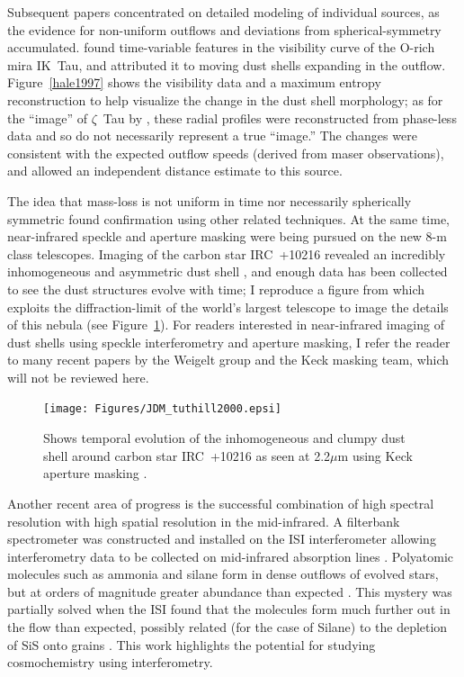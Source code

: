 \documentclass[12pt]{iopart}
\begin{document}
Subsequent papers concentrated on detailed modeling of individual
sources, as the evidence for non-uniform outflows \citep{monnier1997}
and deviations from spherical-symmetry \citep{lopez1997} accumulated.
\citet{hale1997} found time-variable features in the visibility curve
of the O-rich mira IK~Tau, and attributed it to moving dust shells
expanding in the outflow.  Figure~\ref{hale1997} shows the visibility
data and a maximum entropy reconstruction to help visualize the change
in the dust shell morphology; as for the ``image'' of $\zeta$~Tau by
\citet{quirrenbach1994}, these radial profiles were reconstructed from
phase-less data and so do not necessarily represent a true ``image.''
The changes were consistent with the expected outflow speeds (derived
from maser observations), and allowed an independent
distance estimate to this source.

The idea that mass-loss is not uniform in time nor necessarily
spherically symmetric found confirmation using other related
techniques.  At the same time, near-infrared speckle and aperture
masking were being pursued on the new 8-m class telescopes.  Imaging
of the carbon star IRC~+10216 revealed an incredibly inhomogeneous and
asymmetric dust shell \citep{haniff1998,weigelt1998,tuthill2000}, and
enough data has been collected to see the dust structures evolve with
time; I reproduce  a figure from \citet{tuthill2000} which
exploits the diffraction-limit of the world's largest telescope to
image the details of this nebula (see Figure~\ref{irc10216}).  For
readers interested in near-infrared imaging of dust shells using
speckle interferometry and aperture masking, I refer the reader to
many recent papers by the Weigelt group and the Keck masking team,
which will not be reviewed here.

\begin{figure}[tbhp]
\begin{center}
  \texttt{[image: Figures/JDM\_tuthill2000.epsi]}
\caption{\footnotesize Shows temporal evolution of the
  inhomogeneous and clumpy dust shell around carbon star IRC~+10216 as
  seen at 2.2$\mu$m using Keck aperture masking \citep[Figure 1
  from][reproduced with permission of the AAS]{tuthill2000a}.
\label{irc10216}}
\end{center}
\end{figure}

Another recent area of progress is the successful combination of high
spectral resolution with high spatial resolution in the mid-infrared.
A filterbank spectrometer was constructed and installed on the ISI
interferometer allowing interferometry data to be collected on
mid-infrared absorption lines
\citep{monnier2000a,monnier2000b,monnier2000c}.  Polyatomic molecules
such as ammonia and silane form in dense outflows of evolved stars,
but at orders of magnitude greater abundance than expected
\citep[e.g.,][]{keady1993}.  This mystery was partially solved when
the ISI found that the molecules form much further out in the flow
than expected, possibly related (for the case of Silane) to the
depletion of SiS onto grains \citep{bieging1993}.  This work
highlights the potential for studying cosmochemistry using
interferometry.
\end{document}
